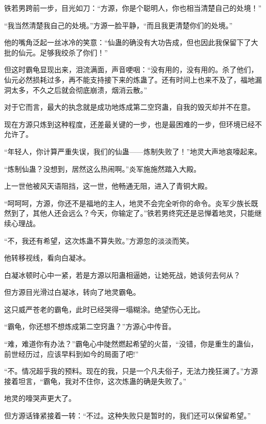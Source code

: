 
\begin{this_body}



铁若男跨前一步，目光如刀：“方源，你是个聪明人，你也相当清楚自己的处境！”

“我当然清楚我自己的处境。”方源一脸平静，“而且我更清楚你们的处境。”

他的嘴角泛起一丝冰冷的笑意：“仙蛊的确没有大功告成，但也因此我保留下了大批的仙元。足够我绞杀了你们！”

但这时霸龟显现出来，泪流满面，声音哽咽：“没有用的，没有用的。杀了他们，仙元必然损耗过多，再不能支持接下来的炼蛊了。还有时间上也来不及了，福地漏洞太多，不久之后就会彻底崩溃，烟消云散。”

对于它而言，最大的执念就是成功地炼成第二空窍蛊，自我的毁灭却并不在意。

现在方源只炼到这种程度，还差最关键的一步，也是最困难的一步，但环境已经不允许了。

“年轻人，你计算严重失误，我们的仙蛊——炼制失败了！”地灵大声地哀嚎起来。

“炼制仙蛊？没想到，居然这么热闹啊。”炎军施施然踏入大殿。

上一世他被风天语阻挡，这一世，他畅通无阻，进入了青铜大殿。

“呵呵呵，方源，你还不是福地的主人，地灵不会完全听你的命令。炎军少族长既然到了，其他人还会远么？今天，你输定了。”铁若男终究还是忌惮着地灵，只能继续心理战。

“不，我还有希望，这次炼蛊不算失败。”方源忽的淡淡而笑。

他转移视线，看向白凝冰。

白凝冰顿时心中一紧，若是方源以阳蛊相逼她，让她死战，她该何去何从？

但方源目光滑过白凝冰，转向了地灵霸龟。

这只威严苍老的霸龟，此时已经哭得一塌糊涂。绝望伤心无比。

“霸龟，你还想不想炼成第二空窍蛊？”方源心中传音。

“难，难道你有办法？”霸龟心中陡然燃起希望的火苗，“没错，你是重生的蛊仙，前世经历过，应该早料到如今的局面了吧!”

“不。情况超乎我的预料。现在的我，只是一个凡夫俗子，无法力挽狂澜了。”方源接着坦言，“霸龟，我对不住你，这次炼蛊的确是失败了。”

地灵的嚎哭声更大了。

但方源话锋紧接着一转：“不过。这种失败只是暂时的，我们还可以保留希望。”


\end{this_body}
